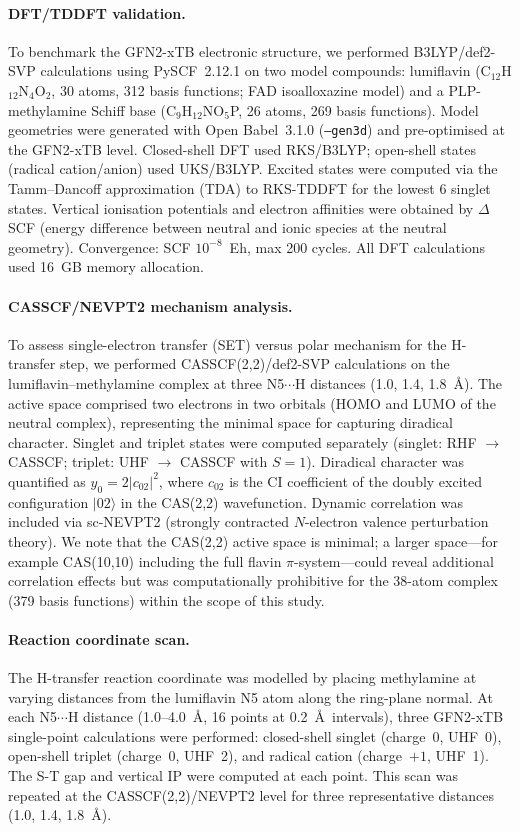 \documentclass[11pt]{article}
\begin{document}
\paragraph{DFT/TDDFT validation.}
To benchmark the GFN2-xTB electronic structure, we performed B3LYP/def2-SVP calculations using PySCF~2.12.1\cite{Sun2020} on two model compounds: lumiflavin (C$_{12}$H$_{12}$N$_4$O$_2$, 30 atoms, 312 basis functions; FAD isoalloxazine model) and a PLP-methylamine Schiff base (C$_9$H$_{12}$NO$_5$P, 26 atoms, 269 basis functions). Model geometries were generated with Open Babel~3.1.0 (\texttt{--gen3d}) and pre-optimised at the GFN2-xTB level. Closed-shell DFT used RKS/B3LYP; open-shell states (radical cation/anion) used UKS/B3LYP. Excited states were computed via the Tamm--Dancoff approximation (TDA) to RKS-TDDFT for the lowest 6 singlet states. Vertical ionisation potentials and electron affinities were obtained by $\Delta$SCF (energy difference between neutral and ionic species at the neutral geometry). Convergence: SCF $10^{-8}$~Eh, max 200 cycles. All DFT calculations used 16~GB memory allocation.

\paragraph{CASSCF/NEVPT2 mechanism analysis.}
To assess single-electron transfer (SET) versus polar mechanism for the H-transfer step, we performed CASSCF(2,2)/def2-SVP calculations on the lumiflavin--methylamine complex at three N5$\cdots$H distances (1.0, 1.4, 1.8~\AA). The active space comprised two electrons in two orbitals (HOMO and LUMO of the neutral complex), representing the minimal space for capturing diradical character. Singlet and triplet states were computed separately (singlet: RHF $\to$ CASSCF; triplet: UHF $\to$ CASSCF with $S = 1$). Diradical character was quantified as $y_0 = 2|c_{02}|^2$, where $c_{02}$ is the CI coefficient of the doubly excited configuration $|02\rangle$ in the CAS(2,2) wavefunction\cite{Nakano2017}. Dynamic correlation was included via sc-NEVPT2 (strongly contracted $N$-electron valence perturbation theory)\cite{Angeli2001}. We note that the CAS(2,2) active space is minimal; a larger space---for example CAS(10,10) including the full flavin $\pi$-system---could reveal additional correlation effects but was computationally prohibitive for the 38-atom complex (379 basis functions) within the scope of this study.

\paragraph{Reaction coordinate scan.}
The H-transfer reaction coordinate was modelled by placing methylamine at varying distances from the lumiflavin N5 atom along the ring-plane normal. At each N5$\cdots$H distance (1.0--4.0~\AA, 16 points at 0.2~\AA\ intervals), three GFN2-xTB single-point calculations were performed: closed-shell singlet (charge~0, UHF~0), open-shell triplet (charge~0, UHF~2), and radical cation (charge~$+1$, UHF~1). The S-T gap and vertical IP were computed at each point. This scan was repeated at the CASSCF(2,2)/NEVPT2 level for three representative distances (1.0, 1.4, 1.8~\AA).
\end{document}
